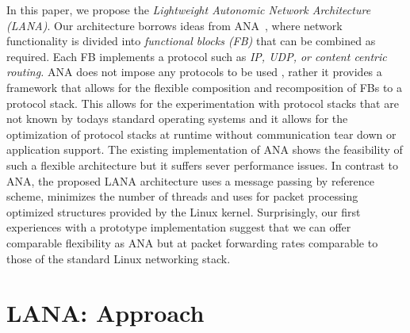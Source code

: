 \documentclass{sig-alternate}
\newcommand{\wolfgang}[1]{\textcolor{blue}{\emph{WM: #1}}}
\begin{document}
In this paper, we propose the \textit{Lightweight Autonomic Network
Architecture (LANA)}. Our architecture borrows ideas from
ANA~\cite{ANAJournal}, where network functionality is divided into
\textit{functional blocks (FB)} that can be combined as required. Each FB
implements a protocol such as \textit{IP, UDP, or content centric
routing.} ANA does not impose any protocols to be used
, rather it provides a framework that allows for the flexible
composition and recomposition of FBs to a protocol stack. This allows for the
experimentation with protocol stacks that are not known by todays standard
operating systems and it allows for the optimization of protocol stacks at
runtime without communication tear down or application support.  The existing
implementation of ANA shows the feasibility of such a flexible architecture but
it suffers sever performance issues. 
In contrast to ANA, the proposed LANA architecture uses a message passing by reference scheme, minimizes the number of threads and uses for packet processing optimized structures provided by the Linux kernel.
Surprisingly, our first experiences with a
prototype implementation suggest that we can offer comparable %
flexibility as ANA but at packet forwarding rates comparable to those of the
standard Linux networking stack. 

\section{LANA: Approach}


\end{document}
